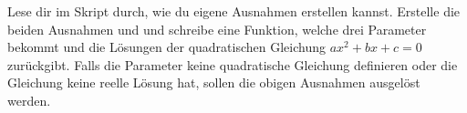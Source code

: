 \begin{aufg}
  Lese dir im Skript durch, wie du eigene Ausnahmen erstellen kannst.
  Erstelle die beiden Ausnahmen  und \linebreak
   und schreibe eine Funktion, welche drei Parameter 
   bekommt und die Lösungen der quadratischen Gleichung
  $ax^2 + bx + c = 0$ zurückgibt. Falls die Parameter keine quadratische
  Gleichung definieren oder die Gleichung keine reelle Lösung hat, sollen
  die obigen Ausnahmen ausgelöst werden.
\end{aufg}
